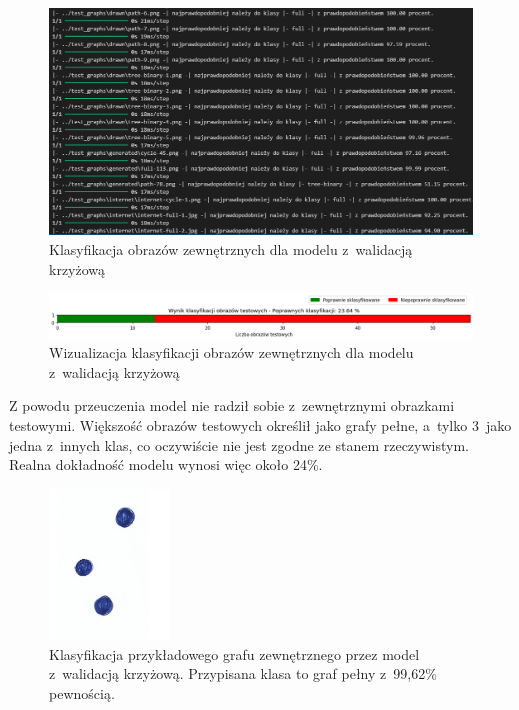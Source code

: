 \begin{figure}[ht]
	\centering
	\includegraphics[width=15.5cm]{resources/tests/images/v3/crossvalid_txt.png}
	\caption{Klasyfikacja obrazów zewnętrznych dla modelu z~walidacją krzyżową}
	\label{Fig:tests-cv-0b}
\end{figure}
\FloatBarrier

\begin{figure}[ht]
	\centering
	\includegraphics[width=15.5cm]{resources/tests/images/v3/crossvalid_bar.png}
	\caption{Wizualizacja klasyfikacji obrazów zewnętrznych dla modelu z~walidacją krzyżową}
	\label{Fig:tests-cv-0c}
\end{figure}
\FloatBarrier

Z powodu przeuczenia model nie radził sobie z~zewnętrznymi obrazkami testowymi.
Większość obrazów testowych określił jako grafy pełne, a~tylko 3~jako jedna z~innych klas,
co oczywiście nie jest zgodne ze stanem rzeczywistym.
Realna dokładność modelu wynosi więc około 24\%.

\begin{figure}[ht]
	\centering
	\includegraphics[height=4cm]{../graph_classification/test_graphs/drawn/empty-1.png}
	\caption{Klasyfikacja przykładowego grafu zewnętrznego przez model z~walidacją krzyżową.
		Przypisana klasa to graf pełny z~99,62\% pewnością.}
	\label{Fig:tests-cv-0d}
\end{figure}
\FloatBarrier

